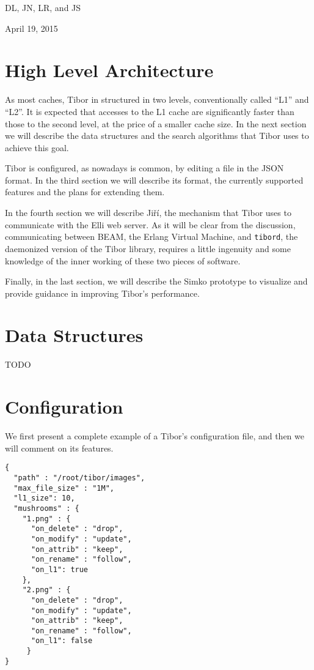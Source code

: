 \documentclass[conference,compsoc]{IEEEtran}
\begin{document}
\hfill DL, JN, LR, and JS
 
\hfill April 19, 2015

\section{High Level Architecture}
As most caches, Tibor in structured in two levels, conventionally called ``L1''
and ``L2''. It is expected that accesses to the L1 cache are significantly
faster than those to the second level, at the price of a smaller cache size.
In the next section we will describe the data structures and the search
algorithms that Tibor uses to achieve this goal.

Tibor is configured, as nowadays is common, by editing a file in the JSON
format. In the third section we will describe its format, the currently
supported features and the plans for extending them.

In the fourth section we will describe Jiří, the mechanism that Tibor uses to
communicate with the Elli web server. As it will be clear from the discussion,
communicating between BEAM, the Erlang Virtual Machine, and \texttt{tibord},
the daemonized version of the Tibor library, requires a little ingenuity and
some knowledge of the inner working of these two pieces of software.

Finally, in the last section, we will describe the Simko prototype to visualize
and provide guidance in improving Tibor's performance.

\section{Data Structures}
TODO

\section{Configuration}
We first present a complete example of a Tibor's configuration file, and then
we will comment on its features.

\begin{verbatim}
{
  "path" : "/root/tibor/images",
  "max_file_size" : "1M",
  "l1_size": 10,
  "mushrooms" : {
    "1.png" : { 
      "on_delete" : "drop",		
      "on_modify" : "update",
      "on_attrib" : "keep",
      "on_rename" : "follow",
      "on_l1": true
    },
    "2.png" : { 
      "on_delete" : "drop",		
      "on_modify" : "update",
      "on_attrib" : "keep",
      "on_rename" : "follow",
      "on_l1": false 
     }
}
\end{verbatim}
\end{document}

